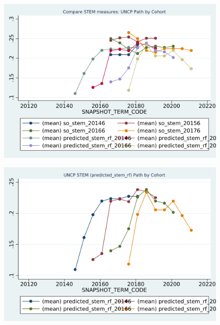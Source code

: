 \begin{figure}[h!]
\begin{centering}
\includegraphics[scale=1]{"figures/UNCP_COMPARE_path_by_cohort_CAREER_STEM"}
\end{centering}
\end{figure}
\newpage
\begin{figure}[h!]
\begin{centering}
\includegraphics[scale=1]{"figures/UNCP_predicted_stem_rf_path_by_cohort_CAREER_STEM"}
\end{centering}
\end{figure}
\newpage
